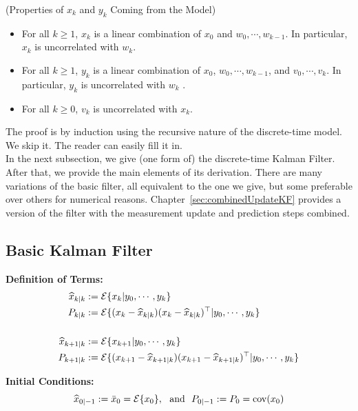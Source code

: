 \begin{lem} (Properties of $x_k$ and $y_k$ Coming from the Model)
 \begin{itemize}
\setlength{\itemsep}{.5cm}
\item  For all $k\ge 1$, $x_k$ is a linear combination of $x_0$ and $w_0, \cdots, w_{k-1}$. In particular, $x_k$ is uncorrelated with $w_k$.

\item  For all $k\ge 1$, $y_k$ is a linear combination of $x_0$, $w_0, \cdots, w_{k-1}$, and $v_0, \cdots, v_k$. In particular, $y_k$ is uncorrelated with $w_k$ .

    \item For all $k\ge 0$, $v_k$ is uncorrelated with $x_k$.

\end{itemize}
 
\end{lem}

The proof is by induction using the recursive nature of the discrete-time model. We skip it. The reader can easily fill it in.\\

In the next subsection, we give (one form of) the discrete-time Kalman Filter. After that, we provide the main elements of its derivation. There are many variations of the basic filter, all equivalent to the one we give, but some preferable over others for numerical reasons. Chapter~\ref{sec:combinedUpdateKF} provides a version of the filter with the measurement update and prediction steps combined.

\subsection{Basic Kalman Filter}
\label{sec:BKF}
\textbf{Definition of Terms:}
\begin{align*}
\widehat{x}_{k|k} &:= {\cal E} \{ x_k | y_0, \cdots, y_k \}\\
P_{k|k} &:={\cal E} \{ (x_k-\widehat{x}_{k|k})(x_k-\widehat{x}_{k|k})^\top | y_0, \cdots, y_k \}\\
& \\
\widehat{x}_{k+1|k} &:= {\cal E} \{  x_{k+1}  |  y_0, \cdots, y_k \}\\
P_{k+1|k}&:= {\cal E} \{ (x_{k+1}-\widehat{x}_{k+1|k})(x_{k+1}-\widehat{x}_{k+1|k})^\top | y_0, \cdots, y_k \}\\
\end{align*}

\textbf{Initial Conditions:}
$$\widehat{x}_{0|-1} :=\bar{x}_0 = {\cal E} \{ x_0 \},~~\mbox{and}~~P_{0|-1}:=P_0=\mathrm{cov}(x_0)  $$

